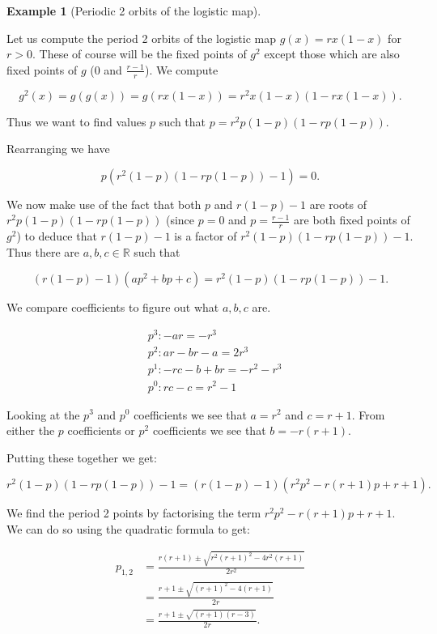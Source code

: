 \documentclass[
  a4paper,
  oneside,
  final]{krantz}
\newcommand{\R}{\mathbb{R}}
\theoremstyle{definition}
\theoremstyle{definition}
\newtheorem{example}{Example}[chapter]
\theoremstyle{definition}
\theoremstyle{definition}
\theoremstyle{remark}
\begin{document}
\begin{example}[Periodic 2 orbits of the logistic map]
\protect\hypertarget{exm:period2logmap}{}\label{exm:period2logmap}

Let us compute the period 2 orbits of the logistic map \(g(x) = r x (1-x)\) for \(r>0\). These of course will be the fixed points of \(g^2\) except those which are also fixed points of \(g\) (\(0\) and \(\frac{r-1}{r}\)). We compute

\[g^2(x) = g(g(x)) = g(rx(1-x)) = r^2x(1-x)(1- rx(1-x)).\]

Thus we want to find values \(p\) such that \(p = r^2p(1-p)(1-rp(1-p))\).

Rearranging we have

\[p \left( r^2(1-p)(1-rp(1-p)) -1 \right) = 0.\]

We now make use of the fact that both \(p\) and \(r(1-p) -1\) are roots of \(r^2p(1-p)(1-rp(1-p))\) (since \(p = 0\) and \(p = \frac{r-1}{r}\) are both fixed points of \(g^2\)) to deduce that \(r(1-p) -1\) is a factor of \(r^2(1-p)(1-rp(1-p)) -1\). Thus there are \(a,b,c \in \R\) such that

\[ (r(1-p) -1) (ap^2 + bp + c) = r^2(1-p)(1-rp(1-p)) -1. \]

We compare coefficients to figure out what \(a,b,c\) are.

\begin{align*}
& p^3: -ar =   -r^3 \\
& p^2: ar-br - a = 2r^3 \\
& p^1: -rc - b + br = -r^2 -r^3 \\
& p^0: rc -c = r^2 - 1
\end{align*}

Looking at the \(p^3\) and \(p^0\) coefficients we see that \(a = r^2\) and \(c = r+1\). From either the \(p\) coefficients or \(p^2\) coefficients we see that \(b = -r(r+1)\).

Putting these together we get:

\[r^2(1-p)(1-rp(1-p)) -1 = (r(1-p) -1) (r^2p^2 - r(r+1)p + r+1).\]

We find the period 2 points by factorising the term \(r^2p^2 - r(r+1)p + r+1\). We can do so using the quadratic formula to get:

\begin{align*}
p_{1,2} &= \frac{r(r+1) \pm \sqrt{r^2 (r+1)^2 - 4 r^2 (r+1)}}{2 r^2} \\ 
&= \frac{r+1 \pm \sqrt{(r+1)^2 - 4(r+1)}}{2r} \\
&= \frac{r+1 \pm \sqrt{(r+1)(r-3)}}{2r}.
\end{align*}


\end{example}
\end{document}
